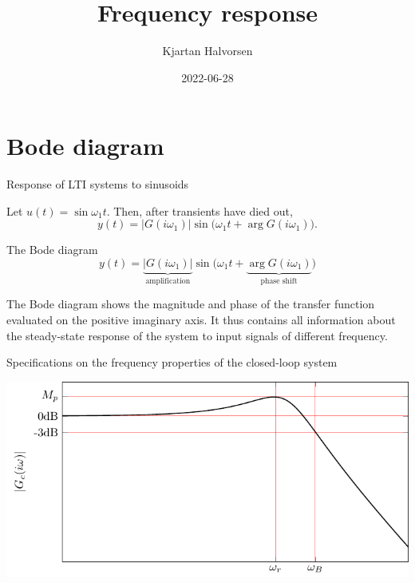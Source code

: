 \documentclass[presentation,aspectratio=169]{beamer}
\author{Kjartan Halvorsen}
\date{2022-06-28}
\title{Frequency response}
\begin{document}
\maketitle

\section{Bode diagram}
\label{sec:org12b14cf}

\begin{frame}[label={sec:orge6079e2}]{Response of LTI systems to sinusoids}
\begin{center}
\end{center}

Let \(u(t) = \sin\omega_1 t\). Then, after transients have died out,
\[ y(t) = |G(i\omega_1)| \sin \big( \omega_1 t + \arg G(i\omega_1)\big). \]
\end{frame}


\begin{frame}[label={sec:org2462e6a}]{The Bode diagram}
\[ y(t) = \underbrace{|G(i\omega_1)|}_{\text{amplification}} \sin \big( \omega_1 t + \underbrace{\arg G(i\omega_1)}_{\text{phase shift}} \big) \]

The Bode diagram shows the magnitude and phase of the transfer function evaluated on the positive imaginary axis. It thus contains all information about the steady-state response of the system to input signals of different frequency.
\end{frame}


\begin{frame}[label={sec:orgade3c46}]{Specifications on the frequency properties of the closed-loop system}
\begin{center}
\includegraphics[width=0.899\linewidth]{../../figures/spec-bode-closed-loop-new}
\end{center}
\end{frame}
\end{document}
